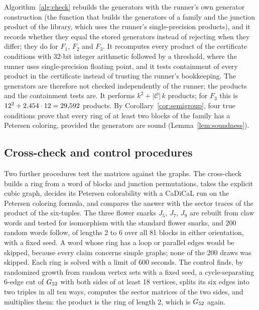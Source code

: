 Algorithm~\ref{alg:check} rebuilds the generators with the runner's own generator construction (the function that builds the generators
of a family and the junction product of the library, which uses the runner's single-precision products), and it records whether they equal the stored
generators instead of rejecting when they differ; they do for $F_1$, $F_2$ and $F_3$. It recomputes every product of the certificate conditions
with 32-bit integer arithmetic followed by a threshold, where the runner uses single-precision floating point, and it tests containment of every product in the
certificate instead of trusting the runner's bookkeeping. The generators are therefore not checked independently of the runner; the products and the containment tests are. It performs $k^2 + |\mathcal{C}|\,k$ products;
for $F_3$ this is $12^2 + 2{,}454 \cdot 12 = 29{,}592$ products. By Corollary~\ref{cor:semigroup}, four true conditions prove that every ring
of at least two blocks of the family has a Petersen coloring, provided the generators are sound
(Lemma~\ref{lem:soundness}).

\subsection{Cross-check and control procedures}\label{sec:alg-cross}

Two further procedures test the matrices against the graphs. The cross-check builds a ring from a word of blocks and junction
permutations, takes the explicit cubic graph, decides its Petersen colorability with a CaDiCaL run on the Petersen coloring
formula, and compares the answer with the sector traces of the product of the six-tuples. The three flower snarks $J_5$, $J_7$, $J_9$ are
rebuilt from claw words and tested for isomorphism with the standard flower snarks, and $200$ random words follow, of lengths 2 to 6 over all 81 blocks
in either orientation, with a fixed seed. A word whose ring has a loop or parallel edges would be skipped, because every claim concerns simple graphs; none of the 200 draws was skipped.
Each ring is solved with a limit of 600 seconds. The control finds, by randomized growth from random vertex sets with a fixed seed, a cycle-separating
6-edge cut of $G_{52}$ with both sides of at least 18 vertices, splits its six edges into two triples in all ten ways, computes the sector
matrices of the two sides, and multiplies them: the product is the ring of length 2, which is $G_{52}$ again.
